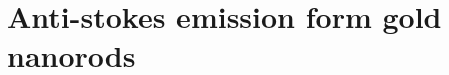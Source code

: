 \documentclass[journal=nalefd,manuscript=letter]{achemso}
\newcommand{\K}{\ensuremath{\,\textrm{K}}}
\begin{document}
% 
% 
% 

\section{Anti-stokes emission form gold nanorods}\label{sec:AS}
\end{document}
